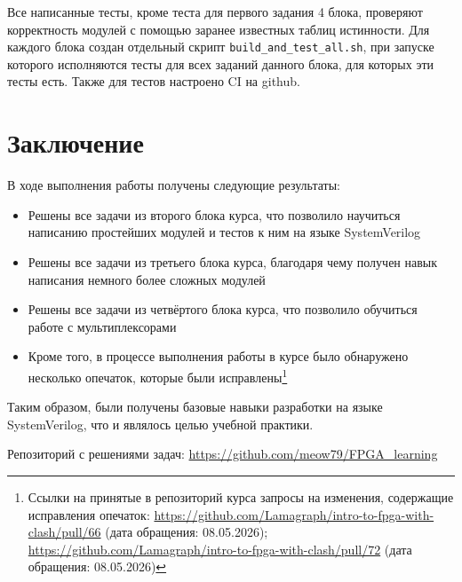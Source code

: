 \documentclass[a4paper]{article}
\begin{document}
Все написанные тесты, кроме теста для первого задания 4 блока, проверяют корректность модулей с помощью заранее известных таблиц истинности. Для каждого блока создан отдельный скрипт \verb|build_and_test_all.sh|, при запуске которого исполняются тесты для всех заданий данного блока, для которых эти тесты есть. Также для тестов настроено CI на github.

\section{Заключение}

В ходе выполнения работы получены следующие результаты:

\begin{itemize}
	\item Решены все задачи из второго блока курса, что позволило научиться написанию простейших модулей и тестов к ним на языке SystemVerilog
    \item Решены все задачи из третьего блока курса, благодаря чему получен навык написания немного более сложных модулей
    \item Решены все задачи из четвёртого блока курса, что позволило обучиться работе с мультиплексорами
    \item Кроме того, в процессе выполнения работы в курсе было обнаружено несколько опечаток, которые были исправлены\footnote{Ссылки на принятые в репозиторий курса запросы на изменения, содержащие исправления опечаток: \url{https://github.com/Lamagraph/intro-to-fpga-with-clash/pull/66} (дата обращения: 08.05.2026); \url{https://github.com/Lamagraph/intro-to-fpga-with-clash/pull/72} (дата обращения: 08.05.2026)}
\end{itemize}

Таким образом, были получены базовые навыки разработки на языке SystemVerilog, что и являлось целью учебной практики.

Репозиторий с решениями задач: \url{https://github.com/meow79/FPGA\_learning}
\end{document}
